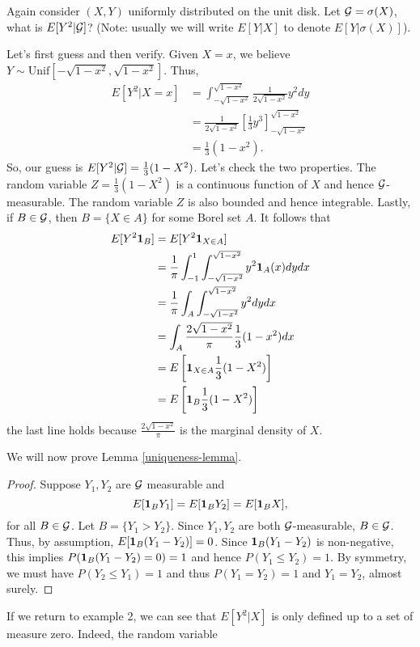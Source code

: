 \begin{example}
    Again consider $(X,Y)$ uniformly distributed on the unit disk. Let ${\mathcal{G}} = \sigma(X)$, what is $E[Y^2|{\mathcal{G}}]$? (Note: usually we will write $E[Y|X]$ to denote $E[Y|\sigma(X)]$). 

    Let's first guess and then verify. Given $X=x$, we believe $Y\sim \text{Unif}[-\sqrt{1-x^2},\sqrt{1-x^2}]$. Thus,
    \begin{align*}
        E[Y^2|X=x] &=\int_{-\sqrt{1-x^2}}^{\sqrt{1-x^2}} \frac{1}{2\sqrt{1-x^2}}y^2 dy\\
        &= \frac{1}{2\sqrt{1-x^2}}\left[\frac{1}{3}y^3\right]_{-\sqrt{1-x^2}}^{\sqrt{1-x^2}}\\
        &=\frac{1}{3}(1-x^2).
    \end{align*}
    So, our guess is $E[Y^2|{\mathcal{G}}]=\frac{1}{3}(1-X^2)$. Let's check the two properties. The random variable $Z=\frac{1}{3}(1-X^2)$ is a continuous function of $X$ and hence ${\mathcal{G}}$-measurable. The random variable $Z$ is also bounded and hence integrable. Lastly, if $B \in {\mathcal{G}}$, then $B=\{X\in A\}$ for some Borel set $A$. It follows that
    \begin{align*}
        E[ Y^2{{\bf 1}}_B]&= E[Y^2{{\bf 1}}_{X \in A}]\\
        &=\frac{1}{\pi}\int_{-1}^1 \int_{-\sqrt{1-x^2}}^{\sqrt{1-x^2}} y^2{{\bf 1}}_{A}(x) dydx\\
        &=\frac{1}{\pi}\int_A \int_{-\sqrt{1-x^2}}^{\sqrt{1-x^2}}y^2dydx\\
        &=\int_A \frac{2\sqrt{1-x^2}}{\pi} \frac{1}{3}(1-x^2)dx\\
        &=E\left[{{\bf 1}}_{X \in A}\frac{1}{3}(1-X^2)\right]\\
        &= E\left[{{\bf 1}}_B\frac{1}{3}(1-X^2)\right]
    \end{align*}
    the last line holds because $\frac{2\sqrt{1-x^2}}{\pi}$ is the marginal density of $X$.
\end{example}
We will now prove Lemma \ref{uniqueness-lemma}.
\begin{proof}
    Suppose $Y_1,Y_2$ are ${\mathcal{G}}$ measurable and 
    \[E[{{\bf 1}}_B Y_1]=E[{{\bf 1}}_B Y_2] = E[{{\bf 1}}_B X], \]
    for all $B \in {\mathcal{G}}$. Let $B = \{Y_1 > Y_2\}$. Since $Y_1,Y_2$ are both ${\mathcal{G}}$-measurable, $B \in {\mathcal{G}}$. Thus, by assumption, $E[{{\bf 1}}_B(Y_1-Y_2)]=0$. Since ${{\bf 1}}_B(Y_1-Y_2)$ is non-negative, this implies $P({{\bf 1}}_B(Y_1-Y_2)=0)=1$ and hence $P(Y_1 \le Y_2)=1$. By symmetry, we must have $P(Y_2 \le Y_1)=1$ and thus $P(Y_1=Y_2)=1$ and $Y_1=Y_2$, almost surely.
\end{proof}
If we return to example 2, we can see that $E[Y^2|X]$ is only defined up to a set of measure zero. Indeed, the random variable 

